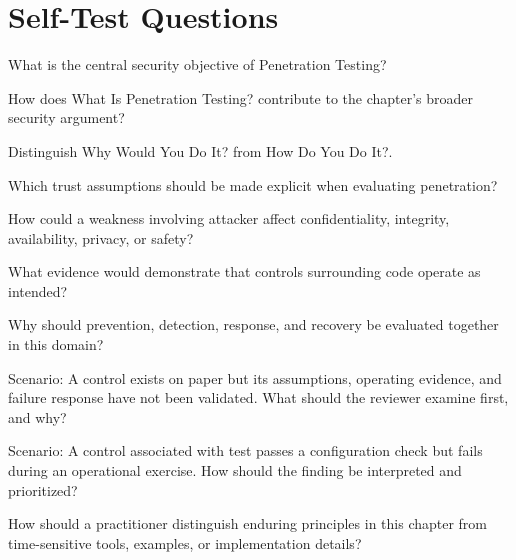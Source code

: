 \documentclass[11pt,letterpaper]{article}
\begin{document}
\section*{Self-Test Questions}
\begin{CornellRecallList}
\item What is the central security objective of Penetration Testing?
\item How does What Is Penetration Testing? contribute to the chapter's broader security argument?
\item Distinguish Why Would You Do It? from How Do You Do It?.
\item Which trust assumptions should be made explicit when evaluating penetration?
\item How could a weakness involving attacker affect confidentiality, integrity, availability, privacy, or safety?
\item What evidence would demonstrate that controls surrounding code operate as intended?
\item Why should prevention, detection, response, and recovery be evaluated together in this domain?
\item Scenario: A control exists on paper but its assumptions, operating evidence, and failure response have not been validated. What should the reviewer examine first, and why?
\item Scenario: A control associated with test passes a configuration check but fails during an operational exercise. How should the finding be interpreted and prioritized?
\item How should a practitioner distinguish enduring principles in this chapter from time-sensitive tools, examples, or implementation details?
\end{CornellRecallList}
\end{document}
